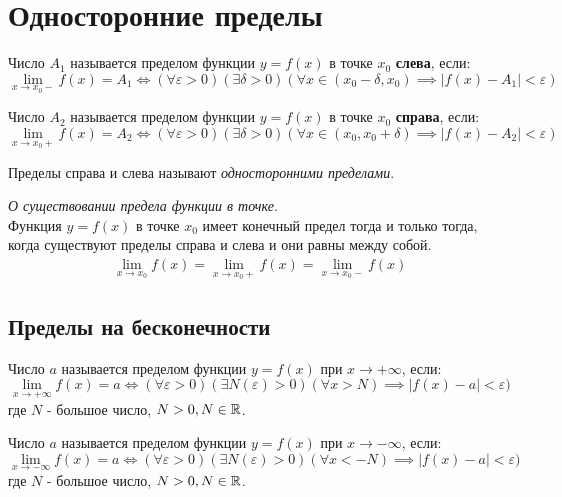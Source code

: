 \section{Односторонние пределы}

\begin{definition}
  Число $A_1$ называется пределом функции $y = f(x)$ в точке $x_0$ \textbf{слева}, если: \[
  \lim_{x \to x_0-} f(x) = A_1 \iff 
  (\forall \varepsilon > 0)(\exists \delta > 0)(\forall x \in (x_0 - \delta, x_0) \implies |f(x) - A_1| < \varepsilon)
  \] 
\end{definition}

\begin{definition}
  Число $A_2$ называется пределом функции $y = f(x)$ в точке $x_0$ \textbf{справа}, если: \[
  \lim_{x \to x_0+} f(x) = A_2 \iff
  (\forall \varepsilon > 0)(\exists \delta > 0)(\forall x \in (x_0, x_0 + \delta) \implies |f(x) - A_2| < \varepsilon)
  \] 
\end{definition}

Пределы справа и слева называют \textit{односторонними пределами}.

\begin{theorem}
  \textit{О существовании предела функции в точке}. \\
  Функция $y = f(x)$ в точке  $x_0$ имеет конечный предел тогда и только тогда, когда существуют пределы справа и слева и они равны между собой.
  \begin{gather*}
    \lim_{x \to x_0} f(x) = \lim_{x \to x_0+} f(x) = \lim_{x \to x_0-} f(x) 
  \end{gather*}
\end{theorem}

\subsection{Пределы на бесконечности}

\begin{definition}
  Число $a$ называется пределом функции $y = f(x)$ при $x \to + \infty$, если: \[
  \lim_{x \to +\infty} f(x) = a \iff (\forall \varepsilon > 0)(\exists N(\varepsilon) > 0)(\forall x > N) \implies |f(x) - a| < \varepsilon)
  \] 
  где $N$ - большое число, $N > 0, N \in \mathbb{R}$.
\end{definition}

\begin{definition}
  Число $a$ называется пределом функции $y = f(x)$ при $x \to - \infty$, если: \[
  \lim_{x \to -\infty} f(x) = a \iff (\forall \varepsilon > 0)(\exists N(\varepsilon) > 0)(\forall x < -N) \implies |f(x) - a| < \varepsilon)
  \] 
  где $N$ - большое число, $N > 0, N \in \mathbb{R}$.
\end{definition}

